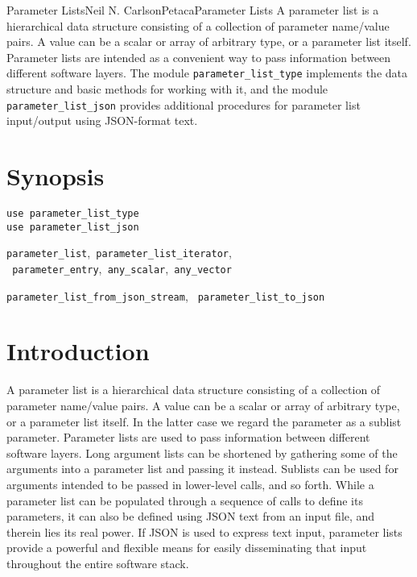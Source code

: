 \documentclass[11pt]{article}
\begin{document}

\begin{Name}{3}{Parameter Lists}{Neil N. Carlson}{Petaca}{Parameter Lists}
A parameter list is a hierarchical data structure consisting of a collection
of parameter name/value pairs.  A value can be a scalar or array of arbitrary
type, or a parameter list itself.  Parameter lists are intended as a convenient
way to pass information between different software layers.  The module
\texttt{parameter_list_type} implements the data structure and basic methods
for working with it, and the module \texttt{parameter_list_json}
provides additional procedures for parameter list input/output using
JSON-format text.
\end{Name}

\section{Synopsis}
\begin{description}[style=nextline]
\item[Usage]
  \texttt{use parameter_list_type}\\
  \texttt{use parameter_list_json}
\item[Derived Types]
  \texttt{parameter_list},\texttt{ parameter_list_iterator},\\
  \texttt{ parameter_entry},\texttt{ any_scalar},\texttt{ any_vector}
\item[Procedures]
  \texttt{parameter_list_from_json_stream},
  \texttt{ parameter_list_to_json}
\end{description}

\section{Introduction}
A parameter list is a hierarchical data structure consisting of a collection
of parameter name/value pairs.  A value can be a scalar or array of arbitrary
type, or a parameter list itself.  In the latter case we regard the parameter
as a sublist parameter.  Parameter lists are used to pass information between
different software layers.  Long argument lists can be shortened by gathering
some of the arguments into a parameter list and passing it instead.  Sublists
can be used for arguments intended to be passed in lower-level calls, and so
forth.  While a parameter list can be populated through a sequence of calls
to define its parameters, it can also be defined using JSON text from an input
file, and therein lies its real power.  If JSON is used to express text input,
parameter lists provide a powerful and flexible means for easily disseminating
that input throughout the entire software stack.
\end{document}
